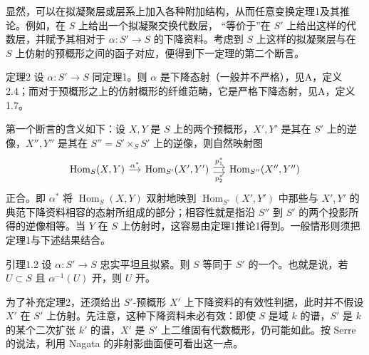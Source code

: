 显然，可以在拟凝聚层或层系上加入各种附加结构，从而任意变换定理1及其推论。例如，在 $S$ 上给出一个拟凝聚交换代数层，
“等价于”在 $S'$ 上给出这样的代数层，并赋予其相对于 $\alpha:S'\to S$ 的下降资料。考虑到 $S$ 上这样的拟凝聚层与在 $S$ 上仿射的预概形之间的函子对应，便得到下一定理的第二个断言。
\begin{statement}{定理2}
设 $\alpha:S'\to S$ 同定理1。则 $\alpha$ 是下降态射（一般并不严格），见A，定义2.4；而对于预概形之上的仿射概形的纤维范畴，它是严格下降态射，见A，定义1.7。
\end{statement}
第一个断言的含义如下：设 $X,Y$ 是 $S$ 上的两个预概形，$X',Y'$ 是其在 $S'$ 上的逆像，$X'',Y''$ 是其在 $S''=S'\times_SS'$ 上的逆像，则自然映射图
\[
\begin{tikzcd}[column sep=small]
\operatorname{Hom}_S(X,Y)\arrow[r,"\alpha^*"]&\operatorname{Hom}_{S'}(X',Y')\arrow[r,shift left=.6ex,"p_1^*"]\arrow[r,shift right=.6ex,"p_2^*"']&\operatorname{Hom}_{S''}(X'',Y'')
\end{tikzcd}
\]
正合。即 $\alpha^*$ 将 $\operatorname{Hom}_S(X,Y)$ 双射地映到 $\operatorname{Hom}_{S'}(X',Y')$ 中那些与 $X',Y'$ 的典范下降资料相容的态射所组成的部分；相容性就是指沿 $S''$ 到 $S'$ 的两个投影所得的逆像相等。当 $Y$ 在 $S$ 上仿射时，这容易由定理1推论1得到。一般情形则须把定理1与下述结果结合。
\begin{statement}{引理1.2}
设 $\alpha:S'\to S$ 忠实平坦且拟紧。则 $S$ 等同于 $S'$ 的一个。也就是说，若 $U\subset S$ 且 $\alpha^{-1}(U)$ 开，则 $U$ 开。
\end{statement}
为了补充定理2，还须给出 $S'$-预概形 $X'$ 上下降资料的有效性判据，此时并不假设 $X'$ 在 $S'$ 上仿射。先注意，这种下降资料未必有效：即使 $S$ 是域 $k$ 的谱，$S'$ 是 $k$ 的某个二次扩张 $k'$ 的谱，$X'$ 是 $S'$ 上二维固有代数概形，仍可能如此。按 Serre 的说法，利用 Nagata 的非射影曲面便可看出这一点。

